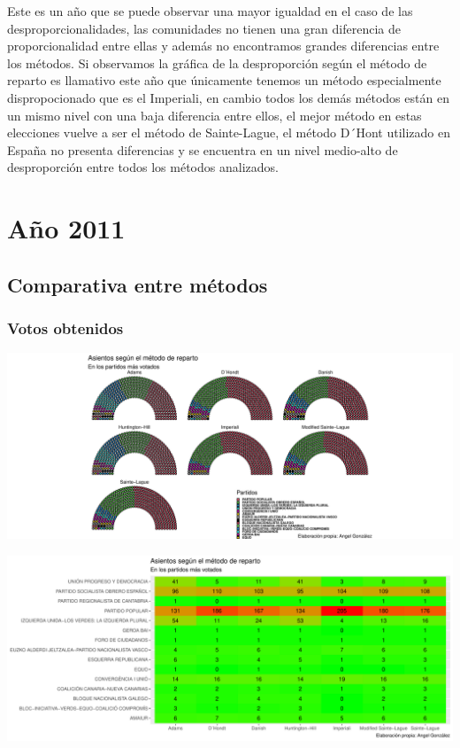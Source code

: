 \documentclass[12pt,a4paper,]{book}
\numberwithin{dummy}{section}
\theoremstyle{ocrenumbox}
\theoremstyle{blacknumex}
\theoremstyle{blacknumbox}
\theoremstyle{ocrenum}
\theoremstyle{ocrenum}
\begin{document}
Este es un año que se puede observar una mayor igualdad en el caso de
las desproporcionalidades, las comunidades no tienen una gran diferencia
de proporcionalidad entre ellas y además no encontramos grandes
diferencias entre los métodos. Si observamos la gráfica de la
desproporción según el método de reparto es llamativo este año que
únicamente tenemos un método especialmente dispropocionado que es el
Imperiali, en cambio todos los demás métodos están en un mismo nivel con
una baja diferencia entre ellos, el mejor método en estas elecciones
vuelve a ser el método de Sainte-Lague, el método D´Hont utilizado en
España no presenta diferencias y se encuentra en un nivel medio-alto de
desproporción entre todos los métodos analizados.

\hypertarget{auxf1o-2011}{%
\section{Año 2011}\label{auxf1o-2011}}

\hypertarget{comparativa-entre-muxe9todos-10}{%
\subsection{Comparativa entre
métodos}\label{comparativa-entre-muxe9todos-10}}

\hypertarget{votos-obtenidos-10}{%
\subsubsection{Votos obtenidos}\label{votos-obtenidos-10}}

\begin{center}\includegraphics[width=0.95\linewidth]{figurasR/unnamed-chunk-152-1} \end{center}

\begin{center}\includegraphics[width=0.95\linewidth]{figurasR/unnamed-chunk-152-2} \end{center}
\end{document}
